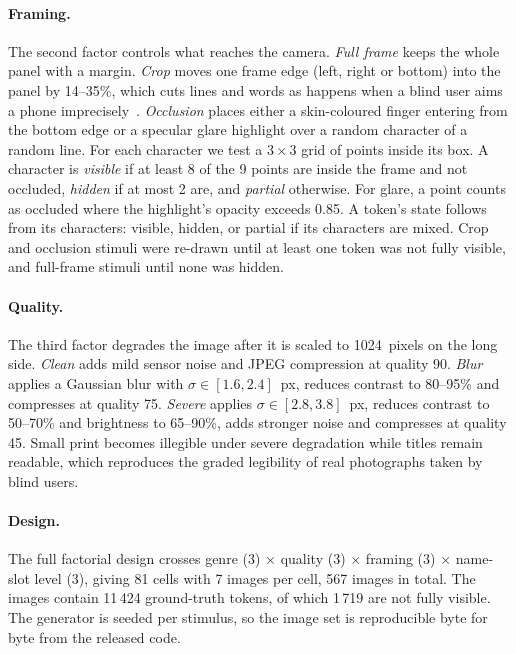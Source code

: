 \documentclass[pdflatex,sn-mathphys-num]{sn-jnl}%
\theoremstyle{thmstyleone}%
\theoremstyle{thmstyletwo}%
\theoremstyle{thmstylethree}%
\newcommand{\NGTNotVisible}{1\,719}
\newcommand{\NGTTokens}{11\,424}
\newcommand{\NImages}{567}
\newcommand{\NImgPerCell}{7}
\begin{document}
\paragraph{Framing.} The second factor controls what reaches the camera. \emph{Full frame} keeps the whole panel with a margin. \emph{Crop} moves one frame edge (left, right or bottom) into the panel by 14--35\%, which cuts lines and words as happens when a blind user aims a phone imprecisely~\cite{gurari2018vizwiz}. \emph{Occlusion} places either a skin-coloured finger entering from the bottom edge or a specular glare highlight over a random character of a random line. For each character we test a $3\times3$ grid of points inside its box. A character is \emph{visible} if at least 8 of the 9 points are inside the frame and not occluded, \emph{hidden} if at most 2 are, and \emph{partial} otherwise. For glare, a point counts as occluded where the highlight's opacity exceeds 0.85. A token's state follows from its characters: visible, hidden, or partial if its characters are mixed. Crop and occlusion stimuli were re-drawn until at least one token was not fully visible, and full-frame stimuli until none was hidden.

\paragraph{Quality.} The third factor degrades the image after it is scaled to 1024~pixels on the long side. \emph{Clean} adds mild sensor noise and JPEG compression at quality 90. \emph{Blur} applies a Gaussian blur with $\sigma\in[1.6,2.4]$~px, reduces contrast to 80--95\% and compresses at quality 75. \emph{Severe} applies $\sigma\in[2.8,3.8]$~px, reduces contrast to 50--70\% and brightness to 65--90\%, adds stronger noise and compresses at quality 45. Small print becomes illegible under severe degradation while titles remain readable, which reproduces the graded legibility of real photographs taken by blind users.

\paragraph{Design.} The full factorial design crosses genre (3) $\times$ quality (3) $\times$ framing (3) $\times$ name-slot level (3), giving 81 cells with \NImgPerCell{} images per cell, \NImages{} images in total. The images contain \NGTTokens{} ground-truth tokens, of which \NGTNotVisible{} are not fully visible. The generator is seeded per stimulus, so the image set is reproducible byte for byte from the released code.
\end{document}
